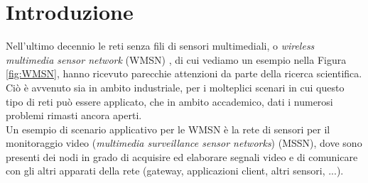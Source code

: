 \chapter{Introduzione}
\label{Introduzione}
\thispagestyle{empty}

Nell'ultimo decennio le reti senza fili di sensori multimediali, o \textit{wireless multimedia sensor network} (WMSN) \cite{akyildiz2007survey}, di cui vediamo un esempio nella Figura \ref{fig:WMSN}, hanno ricevuto parecchie attenzioni da parte della ricerca scientifica.
Ci\`o \`e avvenuto sia in ambito industriale, per i molteplici scenari in cui questo tipo di reti pu\`o essere applicato, che in ambito accademico, dati i numerosi problemi rimasti ancora aperti.\\
Un esempio di scenario applicativo per le WMSN \`e la rete di sensori per il monitoraggio video (\textit{multimedia surveillance sensor networks}) (MSSN), dove sono presenti dei nodi in grado di acquisire ed elaborare segnali video e di comunicare con gli altri apparati della rete (gateway, applicazioni client, altri sensori, ...).

